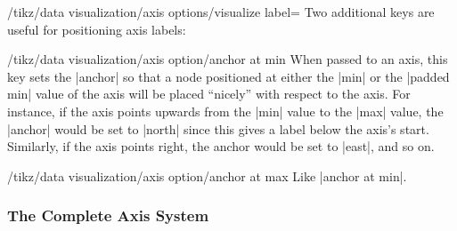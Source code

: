 \begin{key}{/tikz/data visualization/axis options/visualize label=}
    Two additional keys are useful for positioning axis labels:
    \begin{key}{/tikz/data visualization/axis option/anchor at min}
        When passed to an axis, this key sets the |anchor| so that a node positioned at either the |min| or the |padded min| value of the axis will be placed ``nicely'' with respect to the axis. For instance, if the axis points upwards from the |min| value to the |max| value, the |anchor| would be set to |north| since this gives a label below the axis's start. Similarly, if the axis points right, the anchor would be set to |east|, and so on.
    \end{key}
    \begin{key}{/tikz/data visualization/axis option/anchor at max}
        Like |anchor at min|.
    \end{key}
\end{key}


\subsubsection{The Complete Axis System}

